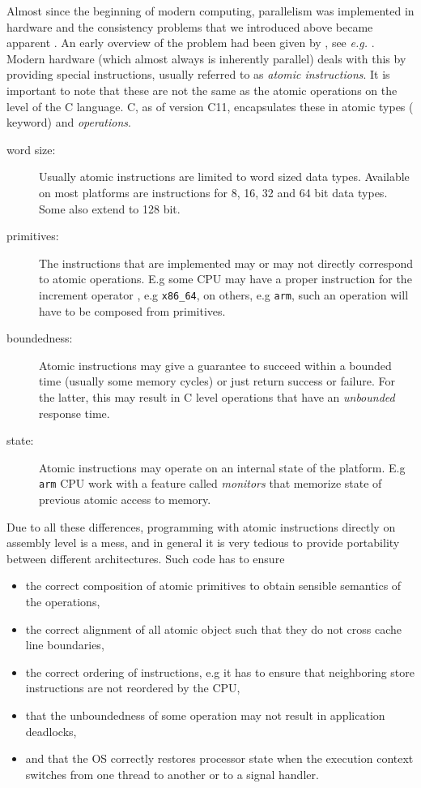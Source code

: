 Almost since the beginning of modern computing, parallelism was
implemented in hardware and the consistency problems that we
introduced above became apparent
\iflong
.
An early overview of the problem had been given by
\else
,
see \textsl{e.g.}
\fi
\cite{Netzer1992}.
Modern hardware (which almost
always is inherently parallel) deals with this by providing special
instructions, usually referred to as \emph{atomic instructions}.
\iflong%
It is important to note that these are not the same as the atomic
operations on the level of the C language.
\else
C, as of version C11, encapsulates these in atomic types (
keyword) and \emph{operations}.
\fi
\iflong
\begin{description}
\item[{word size:}] Usually atomic instructions are limited to word
sized data types. Available on most platforms are
instructions for 8, 16, 32 and 64 bit
data types. Some also extend to 128 bit.\itemadjust
\item[{primitives:}] The instructions that are implemented may or may
not directly correspond to atomic operations. E.g
some CPU may have a proper instruction for the
increment operator \code{++}, e.g \texttt{x86\_64}, on others,
e.g \texttt{arm}, such an operation will have to be
composed from primitives.\itemadjust
\item[{boundedness:}] Atomic instructions may give a guarantee to
succeed within a bounded time (usually some
memory cycles) or just return success or
failure. For the latter, this may result in C
level operations that have an \emph{unbounded}
response time.\itemadjust
\item[{state:}] Atomic instructions may operate on an internal state of
the platform. E.g \texttt{arm} CPU work with a feature called
\emph{monitors} that memorize state of previous atomic
access to memory.\itemadjust
\end{description}

Due to all these differences, programming with atomic instructions
directly on assembly level is a mess, and in general it is very
tedious to provide portability between different
architectures. Such code has to ensure\itemadjust
\begin{itemize}
\item the correct composition of atomic primitives to obtain sensible
semantics of the operations,\itemadjust
\item the correct alignment of all atomic object such that they do not
cross cache line boundaries,\itemadjust
\item the correct ordering of instructions, e.g it has to ensure that
neighboring store instructions are not reordered by the CPU,
\itemadjust
\item that the unboundedness of some operation may not result in
application deadlocks,\itemadjust
\item and that the OS correctly restores processor state when the
execution context switches from one thread to another or to a
signal handler.
\end{itemize}

